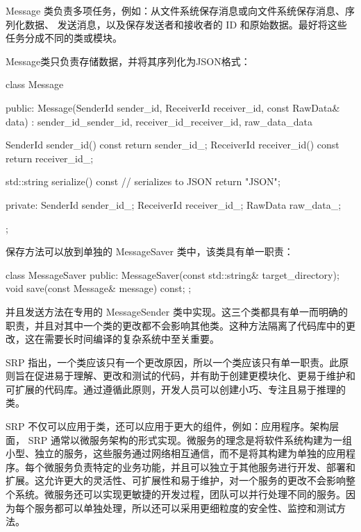 Message 类负责多项任务，例如：从文件系统保存消息或向文件系统保存消息、序列化数据、 发送消息，以及保存发送者和接收者的 ID 和原始数据。最好将这些任务分成不同的类或模块。

Message类只负责存储数据，并将其序列化为JSON格式：

\begin{cpp}
class Message {
public:
    Message(SenderId sender_id, ReceiverId receiver_id,
            const RawData& data)
        : sender_id_{sender_id},
            receiver_id_{receiver_id}, raw_data_{data} {}

    SenderId sender_id() const { return sender_id_; }
    ReceiverId receiver_id() const { return receiver_id_; }

    std::string serialize() const {
        // serializes to JSON
        return {"JSON"};
    }

private:
    SenderId sender_id_;
    ReceiverId receiver_id_;
    RawData raw_data_;
};
\end{cpp}

保存方法可以放到单独的 MessageSaver 类中，该类具有单一职责：

\begin{cpp}
class MessageSaver {
public:
    MessageSaver(const std::string& target_directory);
    void save(const Message& message) const;
};
\end{cpp}

并且发送方法在专用的 MessageSender 类中实现。这三个类都具有单一而明确的职责，并且对其中一个类的更改都不会影响其他类。这种方法隔离了代码库中的更改，这在需要长时间编译的复杂系统中至关重要。

SRP 指出，一个类应该只有一个更改原因，所以一个类应该只有单一职责。此原则旨在促进易于理解、更改和测试的代码，并有助于创建更模块化、更易于维护和可扩展的代码库。通过遵循此原则，开发人员可以创建小巧、专注且易于推理的类。


SRP 不仅可以应用于类，还可以应用于更大的组件，例如：应用程序。架构层面， SRP 通常以微服务架构的形式实现。微服务的理念是将软件系统构建为一组小型、独立的服务，这些服务通过网络相互通信，而不是将其构建为单独的应用程序。每个微服务负责特定的业务功能，并且可以独立于其他服务进行开发、部署和扩展。这允许更大的灵活性、可扩展性和易于维护，对一个服务的更改不会影响整个系统。微服务还可以实现更敏捷的开发过程，团队可以并行处理不同的服务。因为每个服务都可以单独处理，所以还可以采用更细粒度的安全性、监控和测试方法。


